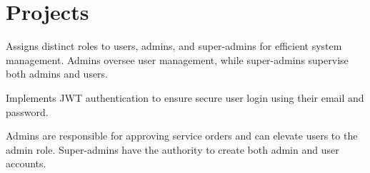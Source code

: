 \documentclass[]{plushcv}
\begin{document}
\begin{minipage}[t]{0.70\textwidth}

\section{Projects}

\begin{tightemize}
\item Assigns distinct roles to users, admins, and super-admins for efficient system management. Admins oversee user management, while super-admins supervise both admins and users.
\item Implements JWT authentication to ensure secure user login using their email and password.
\item Admins are responsible for approving service orders and can elevate users to the admin role. Super-admins have the authority to create both admin and user accounts.
\end{tightemize}
\sectionsep


\end{minipage}
\end{document}
